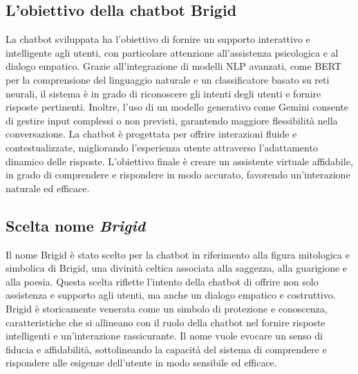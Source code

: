 \documentclass[12pt, letterpaper]{article}
\begin{document}
\subsection{L'obiettivo della chatbot Brigid}
La chatbot sviluppata ha l’obiettivo di fornire un supporto interattivo e intelligente agli utenti, con particolare attenzione all'assistenza psicologica e al dialogo empatico. Grazie all’integrazione di modelli NLP avanzati, come BERT per la comprensione del linguaggio naturale e un classificatore basato su reti neurali, il sistema è in grado di riconoscere gli intenti degli utenti e fornire risposte pertinenti. Inoltre, l’uso di un modello generativo come Gemini consente di gestire input complessi o non previsti, garantendo maggiore flessibilità nella conversazione. La chatbot è progettata per offrire interazioni fluide e contestualizzate, migliorando l’esperienza utente attraverso l’adattamento dinamico delle risposte. L’obiettivo finale è creare un assistente virtuale affidabile, in grado di comprendere e rispondere in modo accurato, favorendo un’interazione naturale ed efficace.

\subsection{Scelta nome \textit{Brigid}}
Il nome Brigid è stato scelto per la chatbot in riferimento alla figura mitologica e simbolica di Brigid, una divinità celtica associata alla saggezza, alla guarigione e alla poesia. Questa scelta riflette l’intento della chatbot di offrire non solo assistenza e supporto agli utenti, ma anche un dialogo empatico e costruttivo. Brigid è storicamente venerata come un simbolo di protezione e conoscenza, caratteristiche che si allineano con il ruolo della chatbot nel fornire risposte intelligenti e un’interazione rassicurante. Il nome vuole evocare un senso di fiducia e affidabilità, sottolineando la capacità del sistema di comprendere e rispondere alle esigenze dell’utente in modo sensibile ed efficace.
\end{document}
